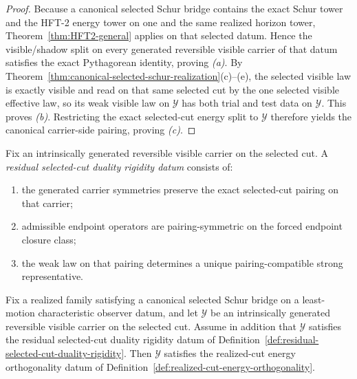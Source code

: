 \begin{proof}
Because a canonical selected Schur bridge contains the exact Schur tower and
the HFT-2 energy tower on one and the same realized horizon tower,
Theorem~\ref{thm:HFT2-general} applies on that selected datum. Hence the
visible/shadow split on every generated reversible visible carrier of that
datum satisfies the exact Pythagorean identity, proving \emph{(a)}. By
Theorem~\ref{thm:canonical-selected-schur-realization}(c)--(e), the selected
visible law is exactly visible and read on that same selected cut by the one
selected visible effective law, so its weak visible law on
\(\mathcal Y\) has both trial and test data on \(\mathcal Y\). This proves
\emph{(b)}. Restricting the exact selected-cut energy split to
\(\mathcal Y\) therefore yields the canonical carrier-side pairing, proving
\emph{(c)}.
\end{proof}

\begin{definition}
\label{def:residual-selected-cut-duality-rigidity}
Fix an intrinsically generated reversible visible carrier on the selected cut.
A \emph{residual selected-cut duality rigidity datum} consists of:
\begin{enumerate}[label=(\roman*), leftmargin=2em, itemsep=0.2em]
\item the generated carrier symmetries preserve the exact selected-cut pairing
      on that carrier;
\item admissible endpoint operators are pairing-symmetric on the forced
      endpoint closure class;
\item the weak law on that pairing determines a unique pairing-compatible
      strong representative.
\end{enumerate}
\end{definition}

\begin{corollary}
\label{cor:canonical-selected-schur-bridge-plus-canonical-duality-forces-realized-cut-energy-orthogonality}
Fix a realized family satisfying a canonical selected Schur bridge on a
least-motion characteristic observer datum, and let \(\mathcal Y\) be an
intrinsically generated reversible visible carrier on the selected cut. Assume
in addition that \(\mathcal Y\) satisfies the residual selected-cut duality
rigidity datum of
Definition~\ref{def:residual-selected-cut-duality-rigidity}. Then \(\mathcal Y\)
satisfies the realized-cut energy orthogonality datum of
Definition~\ref{def:realized-cut-energy-orthogonality}.
\end{corollary}

